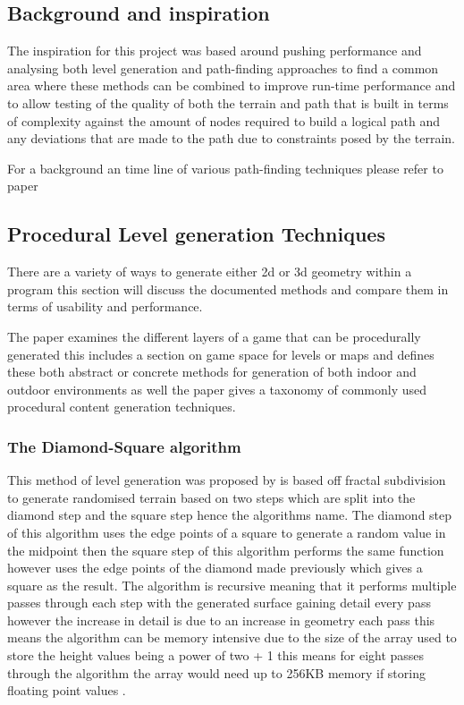 
\setlength\parindent{0cm}

\subsection{Background and inspiration}
The inspiration for this project was based around pushing performance and analysing both level generation and path-finding approaches to find a common area where these methods can be combined to improve run-time performance and to allow testing of the quality of both the terrain and path that is built in terms of complexity against the amount of nodes required to build a logical path and any deviations that are made to the path due to constraints posed by the terrain. 

For a background an time line of various path-finding techniques please refer to paper\cite{Time} 
\subsection{Procedural Level generation Techniques}
There are a variety of ways to generate either 2d or 3d geometry within a program this section will discuss the documented methods and compare them in terms of usability and performance.

The paper \cite{LG-Survey} examines the different layers of a game that can be procedurally generated this includes a section on game space for levels or maps and defines these both abstract or concrete methods for generation of both indoor and outdoor environments as well the paper gives a taxonomy of commonly used procedural content generation techniques.  

\subsubsection{The Diamond-Square algorithm}
This method of level generation was proposed by \cite{DSA2} is based off fractal subdivision to generate randomised terrain based on two steps which are split into the diamond step  and the square step hence the algorithms name. The diamond step of this algorithm uses the edge points of a square to generate a random value in the midpoint then the square step of this algorithm performs the same function however uses the edge points of the diamond made previously which gives a square as the result. The algorithm is recursive meaning that it performs multiple passes through each step with the generated surface gaining detail every pass however the increase in detail is due to an increase in geometry each pass this means the algorithm can be memory intensive due to the size of the array used to store the height values being a power of two + 1 this means for eight passes through the algorithm the array would need up to 256KB memory if storing floating point values \cite{LevelDSA}.

